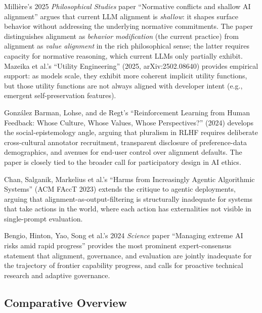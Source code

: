 \documentclass{article}
\begin{document}
Millière's 2025 \emph{Philosophical Studies} paper ``Normative conflicts and shallow AI alignment'' argues that current LLM alignment is \emph{shallow}: it shapes surface behavior without addressing the underlying normative commitments. The paper distinguishes alignment as \emph{behavior modification} (the current practice) from alignment as \emph{value alignment} in the rich philosophical sense; the latter requires capacity for normative reasoning, which current LLMs only partially exhibit. Mazeika et al.'s ``Utility Engineering'' (2025, arXiv:2502.08640) provides empirical support: as models scale, they exhibit more coherent implicit utility functions, but those utility functions are not always aligned with developer intent (e.g., emergent self-preservation features).

González Barman, Lohse, and de Regt's ``Reinforcement Learning from Human Feedback: Whose Culture, Whose Values, Whose Perspectives?'' (2024) develops the social-epistemology angle, arguing that pluralism in RLHF requires deliberate cross-cultural annotator recruitment, transparent disclosure of preference-data demographics, and avenues for end-user control over alignment defaults. The paper is closely tied to the broader call for participatory design in AI ethics.

Chan, Salganik, Markelius et al.'s ``Harms from Increasingly Agentic Algorithmic Systems'' (ACM FAccT 2023) extends the critique to agentic deployments, arguing that alignment-as-output-filtering is structurally inadequate for systems that take actions in the world, where each action has externalities not visible in single-prompt evaluation.

Bengio, Hinton, Yao, Song et al.'s 2024 \emph{Science} paper ``Managing extreme AI risks amid rapid progress'' provides the most prominent expert-consensus statement that alignment, governance, and evaluation are jointly inadequate for the trajectory of frontier capability progress, and calls for proactive technical research and adaptive governance.

\subsection{Comparative Overview}\label{comparative-overview-2}
\end{document}
